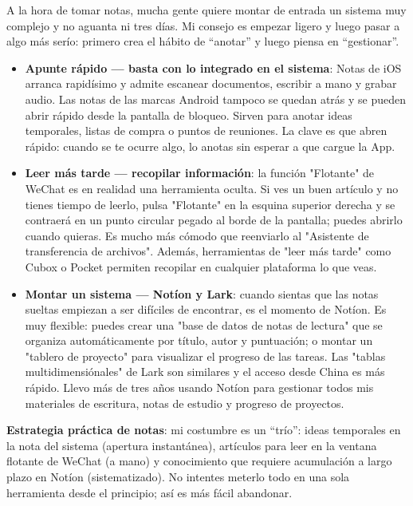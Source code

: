
A la hora de tomar notas, mucha gente quiere montar de entrada un sistema muy complejo y no aguanta ni tres días. Mi consejo es empezar ligero y luego pasar a algo más serío: primero crea el hábito de “anotar” y luego piensa en “gestionar”.

\begin{itemize}
  \item \textbf{Apunte rápido — basta con lo integrado en el sistema}: Notas de iOS arranca rapidísimo y admite escanear documentos, escribir a mano y grabar audio. Las notas de las marcas Android tampoco se quedan atrás y se pueden abrir rápido desde la pantalla de bloqueo. Sirven para anotar ideas temporales, listas de compra o puntos de reuniones. La clave es que abren rápido: cuando se te ocurre algo, lo anotas sin esperar a que cargue la App.
  \item \textbf{Leer más tarde — recopilar información}: la función "Flotante" de WeChat es en realidad una herramienta oculta. Si ves un buen artículo y no tienes tiempo de leerlo, pulsa "Flotante" en la esquina superior derecha y se contraerá en un punto circular pegado al borde de la pantalla; puedes abrirlo cuando quieras. Es mucho más cómodo que reenviarlo al "Asistente de transferencia de archivos". Además, herramientas de "leer más tarde" como Cubox o Pocket permiten recopilar en cualquier plataforma lo que veas.
  \item \textbf{Montar un sistema — Notíon y Lark}: cuando sientas que las notas sueltas empiezan a ser difíciles de encontrar, es el momento de Notíon. Es muy flexible: puedes crear una "base de datos de notas de lectura" que se organiza automáticamente por título, autor y puntuación; o montar un "tablero de proyecto" para visualizar el progreso de las tareas. Las "tablas multidimensiónales" de Lark son similares y el acceso desde China es más rápido. Llevo más de tres años usando Notíon para gestionar todos mis materiales de escritura, notas de estudio y progreso de proyectos.
\end{itemize}

\textbf{Estrategia práctica de notas}: mi costumbre es un “trío”: ideas temporales en la nota del sistema (apertura instantánea), artículos para leer en la ventana flotante de WeChat (a mano) y conocimiento que requiere acumulación a largo plazo en Notíon (sistematizado). No intentes meterlo todo en una sola herramienta desde el principio; así es más fácil abandonar.

